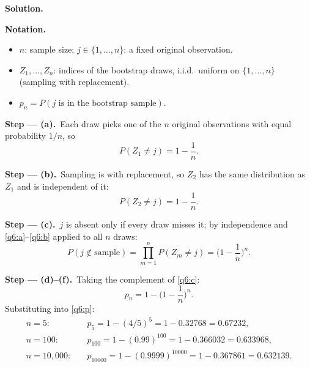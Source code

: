 \documentclass[11pt,a4paper]{article}
\numberwithin{equation}{questao}   %
\newenvironment{notacao}{\par\smallskip\noindent\textbf{Notation.}\begin{itemize}[leftmargin=1.4em,topsep=1pt,itemsep=0pt]\small}{\end{itemize}}
\newcommand{\passo}[2]{\par\smallskip\noindent\textbf{Step --- #1.}~#2}
\newcommand{\solhead}{\par\medskip\noindent{\color{blue!55!black}\rule{\linewidth}{0.3pt}}\par\noindent\textbf{Solution.}}
\begin{document}
\begin{sol}
\solhead
\begin{notacao}
\item $n$: sample size; $j\in\{1,\dots,n\}$: a fixed original observation.
\item $Z_1,\dots,Z_n$: indices of the bootstrap draws, i.i.d.\ uniform on $\{1,\dots,n\}$ (sampling
  with replacement).
\item $p_n=P(j\text{ is in the bootstrap sample})$.
\end{notacao}

\passo{(a)}{Each draw picks one of the $n$ original observations with equal probability $1/n$, so}
\begin{equation}\label{q6:a}
P(Z_1\neq j)=1-\frac1n .
\end{equation}

\passo{(b)}{Sampling is with replacement, so $Z_2$ has the same distribution as $Z_1$ and is
independent of it:}
\begin{equation}\label{q6:b}
P(Z_2\neq j)=1-\frac1n .
\end{equation}

\passo{(c)}{$j$ is absent only if every draw misses it; by independence and \eqref{q6:a}--\eqref{q6:b}
applied to all $n$ draws:}
\begin{equation}\label{q6:c}
P(j\notin\text{sample})=\prod_{m=1}^nP(Z_m\neq j)=\Big(1-\frac1n\Big)^n .
\end{equation}

\passo{(d)--(f)}{Taking the complement of \eqref{q6:c}:}
\begin{equation}\label{q6:p}
p_n=1-\Big(1-\frac1n\Big)^n .
\end{equation}
Substituting into \eqref{q6:p}:
\begin{align*}
n=5:&\quad p_5=1-(4/5)^5=1-0.32768=0.67232,\\
n=100:&\quad p_{100}=1-(0.99)^{100}=1-0.366032=0.633968,\\
n=10{,}000:&\quad p_{10000}=1-(0.9999)^{10000}=1-0.367861=0.632139.
\end{align*}


\end{sol}
\end{document}
